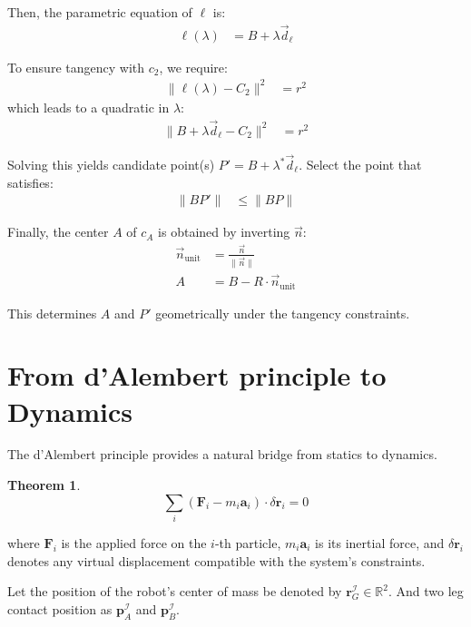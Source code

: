 \documentclass[11pt]{article}
\newtheorem{theorem}[statement]{Theorem}
\begin{document}
Then, the parametric equation of $\ell$ is:
\begin{align*}
    \ell(\lambda) &= B + \lambda \vec{d}_\ell
\end{align*}

To ensure tangency with $c_2$, we require:
\begin{align*}
    \|\ell(\lambda) - C_2\|^2 &= r^2
\end{align*}
which leads to a quadratic in $\lambda$:
\begin{align*}
    \|B + \lambda \vec{d}_\ell - C_2\|^2 &= r^2
\end{align*}

Solving this yields candidate point(s) $P' = B + \lambda^* \vec{d}_\ell$.
Select the point that satisfies:
\begin{align*}
    \|BP'\| &\leq \|BP\|
\end{align*}

Finally, the center $A$ of $c_A$ is obtained by inverting $\vec{n}$:
\begin{align*}
    \vec{n}_{\text{unit}} &= \frac{\vec{n}}{\|\vec{n}\|} \\
    A &= B - R \cdot \vec{n}_{\text{unit}}
\end{align*}

This determines $A$ and $P'$ geometrically under the tangency constraints.

\newpage
\section{From d'Alembert principle to Dynamics}
The d'Alembert principle provides a natural bridge from statics to dynamics. 

\begin{theorem}\label{thm:ld'Alembert}
    \[
    \sum_i \left( \mathbf{F}_i - m_i \mathbf{a}_i \right) \cdot \delta \mathbf{r}_i = 0
    \]
\end{theorem}

where $\mathbf{F}_i$ is the applied force on the $i$-th particle, $m_i \mathbf{a}_i$ is its inertial force, and $\delta \mathbf{r}_i$ denotes any virtual displacement compatible with the system's constraints.

Let the position of the robot's center of mass be denoted by \( \mathbf{r}_G^\mathcal{I} \in \mathbb{R}^2 \). And two leg contact position
as \( \mathbf{p}_A^\mathcal{I} \)  and \( \mathbf{p}_B^\mathcal{I} \).
\end{document}
